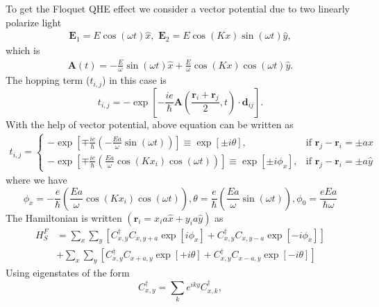 \documentclass[11pt,letterpaper]{article}
\begin{document}
To get the Floquet QHE effect we consider a vector potential due to two linearly polarize light
\begin{eqnarray}
\bm E_1 = E \cos(\omega t) \hat{x},\,\, \bm E_2 = E\cos(Kx) \sin(\omega t) \hat{y},
\end{eqnarray}
which is 
\begin{eqnarray}
\bm A(t) = -\frac{E}{\omega} \sin(\omega t) \hat{x} + \frac{E}{\omega} \cos(Kx) \cos(\omega t) \hat{y}.
\end{eqnarray}
The hopping term ($t_{i,j}$) in this case is
\begin{equation}
	t_{i,j}=-\exp\left[  -\frac{ie}{\hbar}\bm A(\frac{\bm{r}
		_{i}+\bm{r}_{j}}{2}, t) \cdot \bm d_{ij}\right]  .
\end{equation}
With the help of vector potential, above equation can be written as
\begin{eqnarray}
t_{i,j} = \begin{cases}
-\exp\left[  \mp\frac
{ie}{\hbar}\left(  \bm{-}\frac{Ea}{\omega}\sin(\omega t)\right)
\right]  \equiv\exp\left[  \pm i\theta\right] ,& \text{if } \bm{r}_{j}-\bm{r}_{i}=\pm a \hat{x}\\
-\exp\left[  \mp\frac
{ie}{\hbar}\left(  \frac{Ea}{\omega}\cos(Kx_{i})\cos(\omega t)\right)
\right]  \equiv\exp\left[  \pm i\phi_{x}\right], & \text{if } \bm{r}_{j}-\bm{r}_{i}=\pm a \hat{y} 
\end{cases}
\end{eqnarray}
where we have
\begin{equation}
	\phi_{x}=-\frac{e}{\hbar}\left(  \frac{Ea}{\omega}\cos(Kx_{i})\cos(\omega
	t)\right)  ,\theta=\frac{e}{\hbar}\left(  \frac{Ea}{\omega}\sin(\omega
	t)\right)  ,\phi_{0}=\frac{eEa}{\hbar\omega}
\end{equation}
The Hamiltonian is written $(\bm r_{i} = x_i a \hat{x} + y_i a \hat{y})$ as
\begin{align}
	H_{S}^{F} &  =
	{\displaystyle\sum\limits_{x}}
	{\displaystyle\sum\limits_{y}}
	\left[  C_{x,y}^{\dagger}C_{x,y+a}\exp\left[  i\phi_{x}\right]  +C_{x,y}
	^{\dagger}C_{x,y-a}\exp\left[  -i\phi_{x}\right]  \right]  \\
	&  +
	{\displaystyle\sum\limits_{x}}
	{\displaystyle\sum\limits_{y}}
	\left[  C_{x,y}^{\dagger}C_{x+a,y}\exp\left[  +i\theta\right]  +C_{x,y}
	^{\dagger}C_{x-a,y}\exp\left[  -i\theta\right]  \right]  \nonumber
\end{align}
Using eigenstates of the form
\begin{equation}
	C_{x,y}^{\dagger}=
	{\displaystyle\sum\limits_{k}}
	e^{iky}C_{x,k}^{\dagger},
\end{equation}
\end{document}
